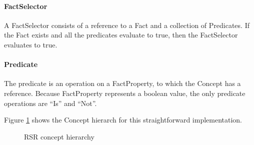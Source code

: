 \paragraph{FactSelector} A FactSelector consists of a reference to a Fact and a collection of Predicates.
If the Fact exists and all the predicates evaluate to true, then the FactSelector evaluates to true.

\paragraph{Predicate} The predicate is an operation on a FactProperty, to which the Concept has a reference.
Because FactProperty represents a boolean value, the only predicate operations are ``Is'' and ``Not''.

Figure \ref{fig:RSRDiagram} shows the Concept hierarch for this straightforward implementation.

\begin{figure}[h]
    \centering
    \caption{RSR concept hierarchy}
    \label{fig:RSRDiagram}
\end{figure}

